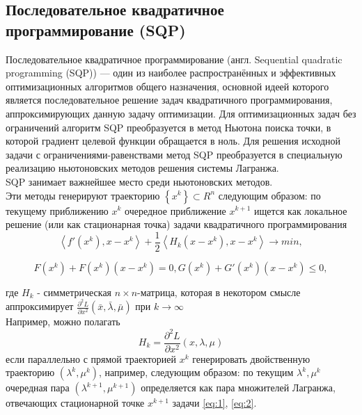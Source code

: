 \documentclass[12pt,a4paper]{article}
\begin{document}
	\subsection{Последовательное квадратичное программирование (SQP)}	
	Последовательное квадратичное программирование (англ. Sequential quadratic\\ programming (SQP)) — один из наиболее распространённых и эффективных оптимизационных алгоритмов общего назначения, основной идеей которого является последовательное решение задач квадратичного программирования, аппроксимирующих данную задачу оптимизации. Для оптимизационных задач без ограничений алгоритм SQP преобразуется в метод Ньютона поиска точки, в которой градиент целевой функции обращается в ноль. Для решения исходной задачи с ограничениями-равенствами метод SQP преобразуется в специальную реализацию ньютоновских методов решения системы Лагранжа.\\
	
	SQP занимает важнейшее место среди ньютоновских методов.\\
	
	Эти методы генерируют траекторию $\left\lbrace x^k \right\rbrace \subset R^n$ следующим образом: по текущему приближению $x^k$  очередное приближение $x^{k+1}$
	ищется как локальное решение
	(или как стационарная точка) задачи квадратичного программирования
	\begin{equation}\label{eq:1}
		\left\langle f'(x^k), x-x^k \right\rangle  + \frac{1}{2}\left\langle H_k(x-x^k), x-x^k \right\rangle \longrightarrow min,
	\end{equation}


	\begin{equation}\label{eq:2}
		F(x^k)+F(x^k)(x-x^k)=0, G(x^k)+G'(x^k)(x-x^k) \leq 0,
	\end{equation}

	где $H_k$ - симметрическая $n \times n$-матрица, которая в некотором смысле аппроксимирует $\frac{\partial^2 L}{\partial x^2}(\bar{x}, \bar{\lambda}, \bar{\mu})$ при $k\longrightarrow\infty$\\ Например, можно полагать
	\begin{equation}
	H_k = \frac{\partial^2 L}{\partial x^2}(x, \lambda, \mu)
	\end{equation}
	если параллельно с прямой траекторией ${x^k}$ генерировать двойственную траекторию ${(\lambda^k, \mu^k)}$,
	например, следующим образом: по текущим $\lambda^k, \mu^k$ очередная пара $(\lambda^{k+1}, \mu^{k+1})$ определяется как пара множителей Лагранжа, отвечающих стационарной точке $x^{k+1}$ задачи \ref{eq:1}, \ref{eq:2}. 
\end{document}
